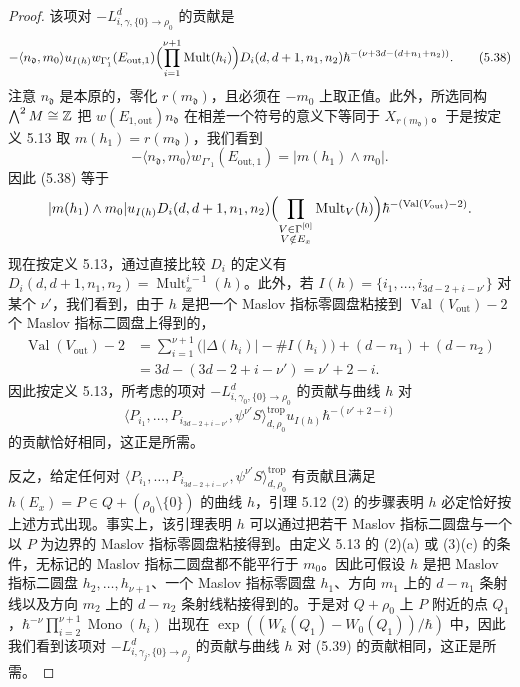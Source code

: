 \begin{proof}
该项对 $-L^d_{i,\gamma,\{0\}\to\rho_0}$ 的贡献是
\begin{equation}
  -\langle n_{\mathfrak d},m_0\rangle u_{I(h)}w_{\Gamma'_1}(E_{\mathrm{out},1})
  \Bigl(\prod_{i=1}^{\nu+1}\operatorname{Mult}(h_i)\Bigr)
  D_i(d,d+1,n_1,n_2)\hbar^{-(\nu+3d-(d+n_1+n_2))}. \tag{5.38}
\end{equation}
注意 $n_{\mathfrak d}$ 是本原的，零化 $r(m_{\mathfrak d})$，且必须在 $-m_0$ 上取正值。此外，所选同构 $\bigwedge^2M\cong\mathbb{Z}$ 把 $w(E_{1,\mathrm{out}})n_{\mathfrak d}$ 在相差一个符号的意义下等同于 $X_{r(m_{\mathfrak d})}$。于是按定义 5.13 取 $m(h_1)=r(m_{\mathfrak d})$，我们看到
\[
  -\langle n_{\mathfrak d},m_0\rangle w_{\Gamma'_1}(E_{\mathrm{out},1})=|m(h_1)\wedge m_0|.
\]
因此 (5.38) 等于
\[
  |m(h_1)\wedge m_0|u_{I(h)}D_i(d,d+1,n_1,n_2)
  \Bigl(\prod_{\substack{V\in\Gamma^{[0]}\\ V\notin E_x}}\operatorname{Mult}_V(h)\Bigr)
  \hbar^{-(\operatorname{Val}(V_{\mathrm{out}})-2)}.
\]
现在按定义 5.13，通过直接比较 $D_i$ 的定义有 $D_i(d,d+1,n_1,n_2)=\operatorname{Mult}^{i-1}_x(h)$。此外，若 $I(h)=\{i_1,\ldots,i_{3d-2+i-\nu'}\}$ 对某个 $\nu'$，我们看到，由于 $h$ 是把一个 Maslov 指标零圆盘粘接到 $\operatorname{Val}(V_{\mathrm{out}})-2$ 个 Maslov 指标二圆盘上得到的，
\[
  \begin{aligned}
    \operatorname{Val}(V_{\mathrm{out}})-2
    &=\sum_{i=1}^{\nu+1}\bigl(|\Delta(h_i)|-\#I(h_i)\bigr)+(d-n_1)+(d-n_2)\\
    &=3d-(3d-2+i-\nu')=\nu'+2-i.
  \end{aligned}
\]
因此按定义 5.13，所考虑的项对 $-L^d_{i,\gamma_0,\{0\}\to\rho_0}$ 的贡献与曲线 $h$ 对
\begin{equation}
  \langle P_{i_1},\ldots,P_{i_{3d-2+i-\nu'}},\psi^{\nu'}S\rangle^{\mathrm{trop}}_{d,\rho_0}u_{I(h)}\hbar^{-(\nu'+2-i)} \tag{5.39}
\end{equation}
的贡献恰好相同，这正是所需。

反之，给定任何对 $\langle P_{i_1},\ldots,P_{i_{3d-2+i-\nu'}},\psi^{\nu'}S\rangle^{\mathrm{trop}}_{d,\rho_0}$ 有贡献且满足 $h(E_x)=P\in Q+(\rho_0\setminus\{0\})$ 的曲线 $h$，引理 5.12 (2) 的步骤表明 $h$ 必定恰好按上述方式出现。事实上，该引理表明 $h$ 可以通过把若干 Maslov 指标二圆盘与一个以 $P$ 为边界的 Maslov 指标零圆盘粘接得到。由定义 5.13 的 (2)(a) 或 (3)(c) 的条件，无标记的 Maslov 指标二圆盘都不能平行于 $m_0$。因此可假设 $h$ 是把 Maslov 指标二圆盘 $h_2,\ldots,h_{\nu+1}$、一个 Maslov 指标零圆盘 $h_1$、方向 $m_1$ 上的 $d-n_1$ 条射线以及方向 $m_2$ 上的 $d-n_2$ 条射线粘接得到的。于是对 $Q+\rho_0$ 上 $P$ 附近的点 $Q_1$，$\hbar^{-\nu}\prod_{i=2}^{\nu+1}\operatorname{Mono}(h_i)$ 出现在 $\exp((W_k(Q_1)-W_0(Q_1))/\hbar)$ 中，因此我们看到该项对 $-L^d_{i,\gamma_j,\{0\}\to\rho_j}$ 的贡献与曲线 $h$ 对 (5.39) 的贡献相同，这正是所需。
\end{proof}

